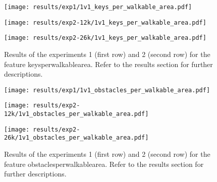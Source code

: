 \begin{figure}[h!]
	\centering
	\begin{minipage}{0.4\linewidth}
		\texttt{[image: results/exp1/1v1\_keys\_per\_walkable\_area.pdf]}
	\end{minipage}
	
	\begin{minipage}{0.4\linewidth}
		\texttt{[image: results/exp2-12k/1v1\_keys\_per\_walkable\_area.pdf]}
	\end{minipage}
	\begin{minipage}{0.4\linewidth}
		\texttt{[image: results/exp2-26k/1v1\_keys\_per\_walkable\_area.pdf]}
	\end{minipage}
	
	\caption[ Results: Feature keys\textunderscore per\textunderscore walkable\textunderscore area]{ Results of the experiments 1 (first row) and 2 (second row) for the feature keys\textunderscore per\textunderscore walkable\textunderscore area. Refer to the results section for further descriptions. }
	\label{fig:appendix_keys_per_walkable_area}
\end{figure}
\newpage 


\begin{figure}[h!]
	\centering
	\begin{minipage}{0.4\linewidth}
		\texttt{[image: results/exp1/1v1\_obstacles\_per\_walkable\_area.pdf]}
	\end{minipage}
	
	\begin{minipage}{0.4\linewidth}
		\texttt{[image: results/exp2-12k/1v1\_obstacles\_per\_walkable\_area.pdf]}
	\end{minipage}
	\begin{minipage}{0.4\linewidth}
		\texttt{[image: results/exp2-26k/1v1\_obstacles\_per\_walkable\_area.pdf]}
	\end{minipage}
	
	\caption[ Results: Feature obstacles\textunderscore per\textunderscore walkable\textunderscore area]{ Results of the experiments 1 (first row) and 2 (second row) for the feature obstacles\textunderscore per\textunderscore walkable\textunderscore area. Refer to the results section for further descriptions. }
	\label{fig:appendix_obstacles_per_walkable_area}
\end{figure}

